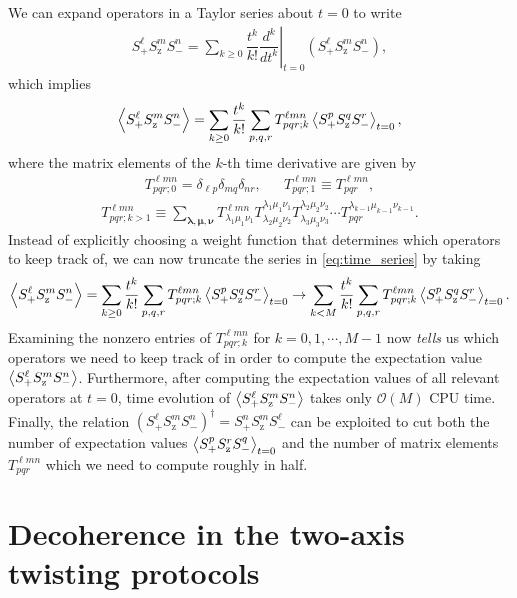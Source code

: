 \documentclass[aps,notitlepage,nofootinbib,11pt]{revtex4-1}
\newcommand{\f}[2]{\dfrac{#1}{#2}} %
\newcommand{\p}[1]{\left(#1\right)} %
\renewcommand{\v}{\bm} %
\newcommand{\bk}{\Braket} %
\renewcommand{\O}{\mathcal{O}}
\newcommand{\z}{\text{z}}
\newcommand{\1}{\mathds{1}}
\begin{document}
We can expand operators in a Taylor series about $t=0$ to write
\begin{align}
  S_+^\ell S_\z^m S_-^n
  = \sum_{k\ge0} \f{t^k}{k!}
  \left.\f{d^k}{dt^k}\right|_{t=0} \p{S_+^\ell S_\z^m S_-^n},
\end{align}
which implies
\begin{align}
  \bk{S_+^\ell S_\z^m S_-^n}
  = \sum_{k\ge0} \f{t^k}{k!}
  \sum_{p,q,r} T^{\ell m n}_{pqr;k} \bk{S_+^p S_\z^q S_-^r}_{t=0},
  \label{eq:time_series}
\end{align}
where the matrix elements of the $k$-th time derivative are given by
\begin{align}
  T^{\ell m n}_{pqr;0}=\delta_{\ell p}\delta_{mq}\delta_{nr},
  &&
  T^{\ell m n}_{pqr;1}\equiv T^{\ell m n}_{pqr},
\end{align}
\begin{align}
  T^{\ell mn}_{pqr;k>1}
  \equiv \sum_{\v\lambda,\v\mu,\v\nu}
  T^{\ell mn}_{\lambda_1 \mu_1 \nu_1}
  T^{\lambda_1 \mu_1 \nu_1}_{\lambda_2 \mu_2 \nu_2}
  T^{\lambda_2 \mu_2 \nu_2}_{\lambda_3 \mu_3 \nu_3}
  \cdots T^{\lambda_{k-1} \mu_{k-1} \nu_{k-1}}_{pqr}.
\end{align}
Instead of explicitly choosing a weight function that determines which
operators to keep track of, we can now truncate the series in
\eqref{eq:time_series} by taking
\begin{align}
  \bk{S_+^\ell S_\z^m S_-^n}
  = \sum_{k\ge0} \f{t^k}{k!}
  \sum_{p,q,r} T^{\ell m n}_{pqr;k} \bk{S_+^p S_\z^q S_-^r}_{t=0}
  \to \sum_{k<M} \f{t^k}{k!}
  \sum_{p,q,r} T^{\ell m n}_{pqr;k} \bk{S_+^p S_\z^q S_-^r}_{t=0}.
\end{align}
Examining the nonzero entries of $T^{\ell mn}_{pqr;k}$ for
$k=0,1,\cdots,M-1$ now {\it tells} us which operators we need to keep
track of in order to compute the expectation value
$\bk{S_+^\ell S_\z^m S_-^n}$.  Furthermore, after computing the
expectation values of all relevant operators at $t=0$, time evolution
of $\bk{S_+^\ell S_\z^m S_-^n}$ takes only $\O\p{M}$ CPU time.
Finally, the relation
$\p{S_+^\ell S_\z^m S_-^n}^\dag=S_+^n S_\z^m S_-^\ell$ can be
exploited to cut both the number of expectation values
$\bk{S_+^p S_\z^r S_-^q}_{t=0}$ and the number of matrix elements
$T^{\ell mn}_{pqr}$ which we need to compute roughly in half.


\section{Decoherence in the two-axis twisting protocols}
\end{document}
